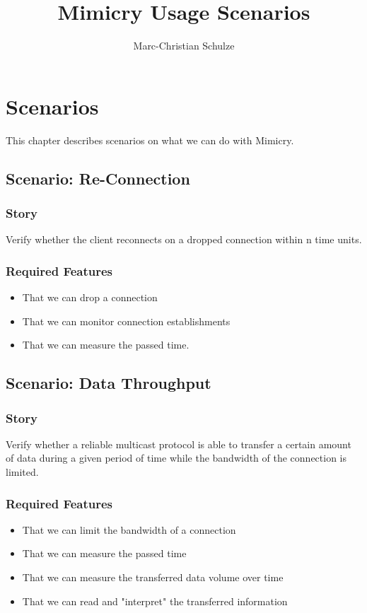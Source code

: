 \documentclass[a4paper,oneside]{book}
\title{Mimicry Usage Scenarios}
\author{Marc-Christian Schulze}
\begin{document}
\maketitle

\tableofcontents

\chapter{Scenarios}
This chapter describes scenarios on what we can do with Mimicry.

\section{Scenario: Re-Connection}
\subsection{Story}
Verify whether the client reconnects on a dropped connection within n time units.
\subsection{Required Features}
\begin{itemize}
\item That we can drop a connection
\item That we can monitor connection establishments
\item That we can measure the passed time.
\end{itemize}


\section{Scenario: Data Throughput}
\subsection{Story}
Verify whether a reliable multicast protocol is able to transfer a certain amount of data during a given period of time while the bandwidth of the connection is limited.
\subsection{Required Features}
\begin{itemize}
\item That we can limit the bandwidth of a connection
\item That we can measure the passed time
\item That we can measure the transferred data volume over time
\item That we can read and "interpret" the transferred information
\end{itemize}
\end{document}
